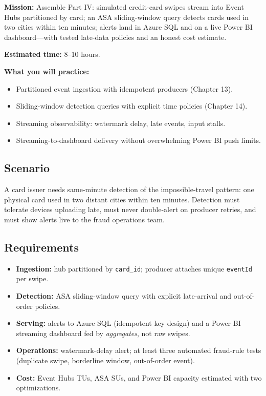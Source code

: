 \begin{capstonebox}
\textbf{Mission:} Assemble Part IV: simulated credit-card swipes stream into Event Hubs partitioned by card; an ASA sliding-window query detects cards used in two cities within ten minutes; alerts land in Azure SQL and on a live Power BI dashboard---with tested late-data policies and an honest cost estimate.

\textbf{Estimated time:} 8--10 hours.

\textbf{What you will practice:}
\begin{itemize}
    \item Partitioned event ingestion with idempotent producers (Chapter 13).
    \item Sliding-window detection queries with explicit time policies (Chapter 14).
    \item Streaming observability: watermark delay, late events, input stalls.
    \item Streaming-to-dashboard delivery without overwhelming Power BI push limits.
\end{itemize}
\end{capstonebox}

\subsection*{Scenario}
A card issuer needs same-minute detection of the impossible-travel pattern: one physical card used in two distant cities within ten minutes. Detection must tolerate devices uploading late, must never double-alert on producer retries, and must show alerts live to the fraud operations team.

\subsection*{Requirements}
\begin{itemize}
    \item \textbf{Ingestion:} hub partitioned by \texttt{card\_id}; producer attaches unique \texttt{eventId} per swipe.
    \item \textbf{Detection:} ASA sliding-window query with explicit late-arrival and out-of-order policies.
    \item \textbf{Serving:} alerts to Azure SQL (idempotent key design) and a Power BI streaming dashboard fed by \emph{aggregates}, not raw swipes.
    \item \textbf{Operations:} watermark-delay alert; at least three automated fraud-rule tests (duplicate swipe, borderline window, out-of-order event).
    \item \textbf{Cost:} Event Hubs TUs, ASA SUs, and Power BI capacity estimated with two optimizations.
\end{itemize}

